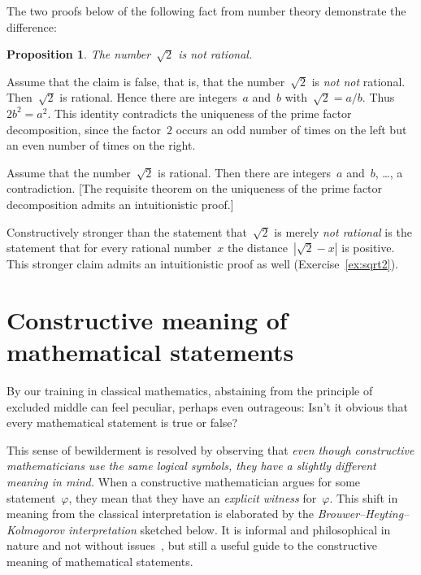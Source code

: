 \documentclass[10pt,reqno,a4paper,openany]{amsbook}
\makeatletter
\theoremstyle{definition}
\theoremstyle{plain}
\newtheorem{prop}[defn]{Proposition}
\theoremstyle{remark}
\newcommand{\?}{\,{:}\,}
\renewcommand{\_}{\mathpunct{.}\,}
\renewenvironment{proof}[1][\proofname]{\par
  \pushQED{\qed}%
  \normalfont \topsep6\p@\@plus6\p@\relax
  \trivlist
  \item[\hskip\labelsep
        \itshape
    #1\@addpunct{.}]\ignorespaces
}{%
  \popQED\endtrivlist\@endpefalse
}
\makeatother
\begin{document}
The two proofs below of the following fact from number theory demonstrate the
difference:
\begin{prop}\label{prop:sqrt2}The number~$\sqrt{2}$ is not rational.\end{prop}
\begin{proof}[Proof (only valid classically)]
Assume that the claim is false, that is, that the number~$\sqrt{2}$ is
\emph{not not} rational. Then~$\sqrt{2}$ is rational. Hence there are
integers~$a$ and~$b$ with~$\sqrt{2} = a / b$. Thus~$2b^2 = a^2$. This identity
contradicts the uniqueness of the prime factor decomposition, since the
factor~$2$ occurs an odd number of times on the left but an even number of
times on the right.
\end{proof}
\begin{proof}[Proof (also valid intuitionistically)]
Assume that the number~$\sqrt{2}$ is rational. Then there are integers~$a$
and~$b$, \ldots, a contradiction.
[The requisite theorem on the uniqueness of the prime factor decomposition admits an
intuitionistic proof.]
\end{proof}

Constructively stronger than the statement that~$\sqrt{2}$ is merely
\emph{not rational} is the statement that for every rational number~$x$
the distance~$|\sqrt{2} - x|$ is positive. This stronger claim admits an
intuitionistic proof as well (Exercise~\ref{ex:sqrt2}).


\section{Constructive meaning of mathematical statements}

By our training in classical mathematics, abstaining from the principle of
excluded middle can feel peculiar, perhaps even outrageous: Isn't it obvious
that every mathematical statement is true or false?

This sense of bewilderment is resolved by observing that \emph{even though
constructive mathematicians use the same logical symbols, they have a slightly
different meaning in mind.} When a constructive mathematician argues for some
statement~$\varphi$, they mean that they have an \emph{explicit witness}
for~$\varphi$. This shift in meaning from the classical interpretation is
elaborated by the \emph{Brouwer--Heyting--Kolmogorov interpretation} sketched
below. It is informal and philosophical in nature and not without
issues~\cite{artemov:bhk,sanz-piecha:critical-bhk,dalen:bhk}, but still a useful guide to
the constructive meaning of mathematical statements.
\end{document}
